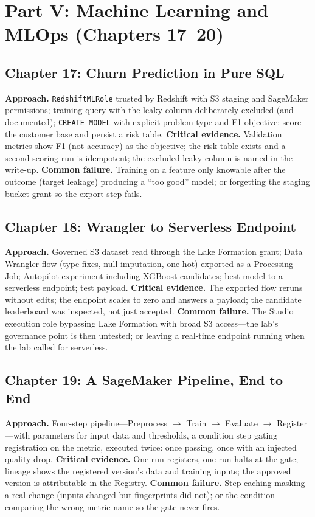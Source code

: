 \section{Part V: Machine Learning and MLOps (Chapters 17--20)}
\subsection{Chapter 17: Churn Prediction in Pure SQL}
\textbf{Approach.} \texttt{RedshiftMLRole} trusted by Redshift with S3 staging and SageMaker
permissions; training query with the leaky column deliberately excluded (and documented);
\texttt{CREATE MODEL} with explicit problem type and F1 objective; score the customer base and
persist a risk table.
\textbf{Critical evidence.} Validation metrics show F1 (not accuracy) as the objective; the risk
table exists and a second scoring run is idempotent; the excluded leaky column is named in the
write-up.
\textbf{Common failure.} Training on a feature only knowable after the outcome (target leakage)
producing a ``too good'' model; or forgetting the staging bucket grant so the export step fails.

\subsection{Chapter 18: Wrangler to Serverless Endpoint}
\textbf{Approach.} Governed S3 dataset read through the Lake Formation grant; Data Wrangler flow
(type fixes, null imputation, one-hot) exported as a Processing Job; Autopilot experiment
including XGBoost candidates; best model to a serverless endpoint; test payload.
\textbf{Critical evidence.} The exported flow reruns without edits; the endpoint scales to zero
and answers a payload; the candidate leaderboard was inspected, not just accepted.
\textbf{Common failure.} The Studio execution role bypassing Lake Formation with broad S3
access---the lab's governance point is then untested; or leaving a real-time endpoint running
when the lab called for serverless.

\subsection{Chapter 19: A SageMaker Pipeline, End to End}
\textbf{Approach.} Four-step pipeline---Preprocess $\rightarrow$ Train $\rightarrow$ Evaluate
$\rightarrow$ Register---with parameters for input data and thresholds, a condition step gating
registration on the metric, executed twice: once passing, once with an injected quality drop.
\textbf{Critical evidence.} One run registers, one run halts at the gate; lineage shows the
registered version's data and training inputs; the approved version is attributable in the
Registry.
\textbf{Common failure.} Step caching masking a real change (inputs changed but fingerprints
did not); or the condition comparing the wrong metric name so the gate never fires.

